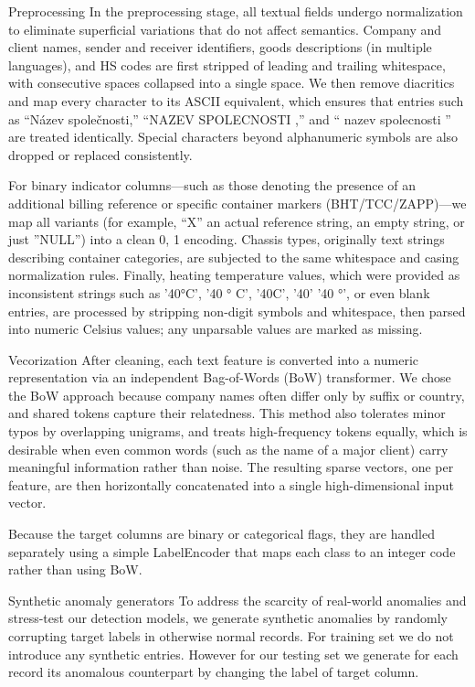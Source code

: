 \secc Preprocessing
In the preprocessing stage, all textual fields undergo normalization to eliminate superficial variations that do not affect semantics. Company and client names, sender and receiver identifiers, goods descriptions (in multiple languages), and HS codes are first stripped of leading and trailing whitespace, with consecutive spaces collapsed into a single space. We then remove diacritics and map every character to its ASCII equivalent, which ensures that entries such as “Název společnosti,” “NAZEV SPOLECNOSTI ,” and “ nazev    spolecnosti ” are treated identically. Special characters beyond alphanumeric symbols are also dropped or replaced consistently.

For binary indicator columns—such as those denoting the presence of an additional billing reference or specific container markers (BHT/TCC/ZAPP)—we map all variants (for example, “X” an actual reference string, an empty string, or just ''NULL'') into a clean {0, 1} encoding. Chassis types, originally text strings describing container categories, are subjected to the same whitespace and casing normalization rules. Finally, heating temperature values, which were provided as inconsistent strings such as '40°C', '40 ° C', '40C', '40' '40 °', or even blank entries, are processed by stripping non-digit symbols and whitespace, then parsed into numeric Celsius values; any unparsable values are marked as missing.

\secc Vecorization
After cleaning, each text feature is converted into a numeric representation via an independent Bag-of-Words (BoW) transformer. We chose the BoW approach because company names often differ only by suffix or country, and shared tokens capture their relatedness. This method also tolerates minor typos by overlapping unigrams, and treats high-frequency tokens equally, which is desirable when even common words (such as the name of a major client) carry meaningful information rather than noise.  The resulting sparse vectors, one per feature, are then horizontally concatenated into a single high-dimensional input vector.

Because the target columns are binary or categorical flags, they are handled separately using a simple LabelEncoder that maps each class to an integer code rather than using BoW.

\secc Synthetic anomaly generators
To address the scarcity of real-world anomalies and stress-test our detection models, we generate synthetic anomalies by randomly corrupting target labels in otherwise normal records. For training set we do not introduce any synthetic entries. However for our testing set we generate for each record its anomalous counterpart by changing the label of target column.

